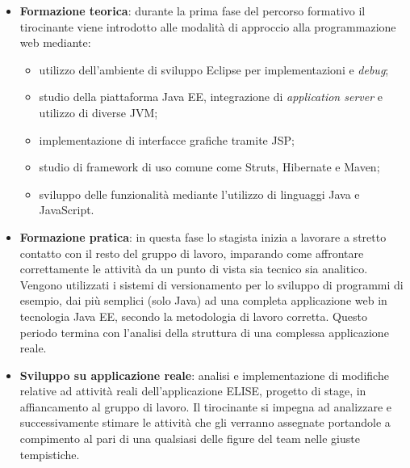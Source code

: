 	\begin{itemize}
		\item \textbf{Formazione teorica}: durante la prima fase del percorso formativo il tirocinante viene introdotto alle modalità di approccio alla programmazione web mediante: 
			\begin{itemize}
				\item utilizzo dell'ambiente di sviluppo Eclipse per implementazioni e \textit{debug};
				\item studio della piattaforma Java EE, integrazione di \textit{application server} e utilizzo di diverse JVM;
				\item implementazione di interfacce grafiche tramite JSP;
				\item studio di framework di uso comune come Struts, Hibernate e Maven;
				\item sviluppo delle funzionalità mediante l'utilizzo di linguaggi Java e JavaScript.
			\end{itemize}
		\item \textbf{Formazione pratica}: in questa fase lo stagista inizia a lavorare a stretto contatto con il resto del gruppo di lavoro, imparando come affrontare correttamente le attività da un punto di vista sia tecnico sia analitico. Vengono utilizzati i sistemi di versionamento per lo sviluppo di programmi di esempio, dai più semplici (solo Java) ad una completa applicazione web in tecnologia Java EE, secondo la metodologia di lavoro corretta. Questo periodo termina con l'analisi della struttura di una complessa applicazione reale.
		
		\item \textbf{Sviluppo su applicazione reale}: analisi e implementazione di modifiche relative ad attività reali dell'applicazione ELISE, progetto di stage, in affiancamento al gruppo di lavoro. Il tirocinante si impegna ad analizzare e successivamente stimare le attività che gli verranno assegnate portandole a compimento al pari di una qualsiasi delle figure del team nelle giuste tempistiche.		
	\end{itemize}
	
